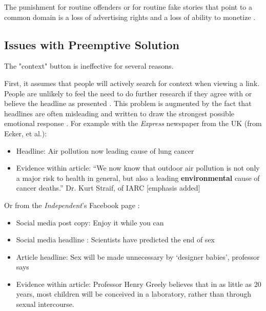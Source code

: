 \documentclass[NETN,manuscript]{stjour-new}
\begin{document}
 The punishment for routine offenders or for routine fake stories that point to a common domain is a loss of advertising rights and a loss of ability to monetize \citep{facebook2020fact}.
 
 
 
 \subsection{Issues with Preemptive Solution}
 The "context" button is ineffective for several reasons. 
 
 First, it assumes that people will actively search for context when viewing a link. People are unlikely to feel the need to do further research if they agree with or believe the headline as presented \citep{nyhan2010corrections}. This problem is augmented by the fact that headlines are often misleading and written to draw the strongest possible emotional response \citep{chesney2017incongruent,ecker2014effects,bell1984good,molek2013towards,kilgo2018new,vettehen2008explaining}. For example with the \textit{Express} newspaper from the UK (from Ecker, et al.):
 \begin{itemize}
 \item Headline: Air pollution now leading cause of lung cancer
\item Evidence within article: “We now know that outdoor air pollution is not only a major risk to health in general, but also a leading \textbf{environmental} cause of cancer deaths.” Dr. Kurt Straif, of IARC [emphasis added]
 \end{itemize}
 
 Or from the \textit{Independent}'s Facebook page \citep{chesney2017incongruent}:
 \begin{itemize}
\item Social media post copy: Enjoy it while you
can
\item Social media headline \footnotemark[1]: Scientists have predicted the end of sex
\item Article headline\footnotemark[2]: Sex will be made unnecessary by ‘designer babies’, professor says
\item Evidence within article: Professor Henry Greely believes that in as little as 20 years, most children will be conceived in a laboratory, rather than through sexual intercourse.
 \end{itemize}
 
\end{document}
